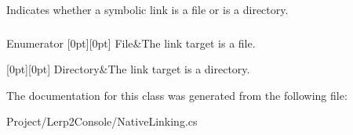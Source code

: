 Indicates whether a symbolic link is a file or is a directory. 



 

 

\subsubsection*{}\begin{DoxyEnumFields}{Enumerator}
[0pt][0pt]{}\mbox{\label{class_lerp2_console_1_1_native_enums_a4eb3b3db1c6666b1e520bd67a14d9727a0b27918290ff5323bea1e3b78a9cf04e}} 
File&The link target is a file. \\
\hline

[0pt][0pt]{}\mbox{\label{class_lerp2_console_1_1_native_enums_a4eb3b3db1c6666b1e520bd67a14d9727ae73cda510e8bb947f7e61089e5581494}} 
Directory&The link target is a directory. \\
\hline

\end{DoxyEnumFields}


The documentation for this class was generated from the following file\+:\begin{DoxyCompactItemize}
\item 
Project/\+Lerp2\+Console/Native\+Linking.\+cs\end{DoxyCompactItemize}
